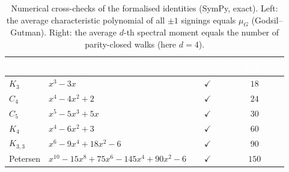 \begin{table}[t]
  \centering
  \small
  \caption{Numerical cross-checks of the formalised identities (SymPy, exact).
  Left: the average characteristic polynomial of all $\pm1$ signings equals
  $\mu_G$ (Godsil--Gutman). Right: the average $d$-th spectral moment equals the
  number of parity-closed walks (here $d=4$).}
  \label{tab:checks}
  \begin{tabular}{@{}llcc@{}}
    \toprule
    \rowcolor{ggteal}
    \textcolor{white}{\textbf{$G$}} & \textcolor{white}{\textbf{$2^{-|E|}\!\sum_{\mathrm{signings}}\det(xI-A_s)$}} & \textcolor{white}{\textbf{$=\mu_G$?}} & \textcolor{white}{\textbf{$\overline{\mathrm{tr}(A_s^{4})}=P_4$}} \\
    \midrule
    \rowcolor{ggband}
    $K_3$ & $x^{3}-3x$         & $\checkmark$ & $18$ \\
    $C_4$ & $x^{4}-4x^{2}+2$   & $\checkmark$ & $24$ \\
    \rowcolor{ggband}
    $C_5$ & $x^{5}-5x^{3}+5x$  & $\checkmark$ & $30$ \\
    $K_4$ & $x^{4}-6x^{2}+3$   & $\checkmark$ & $60$ \\
    \rowcolor{ggband}
    $K_{3,3}$ & $x^{6}-9x^{4}+18x^{2}-6$ & $\checkmark$ & $90$ \\
    Petersen & $x^{10}-15x^{8}+75x^{6}-145x^{4}+90x^{2}-6$ & $\checkmark$ & $150$ \\
    \bottomrule
  \end{tabular}
\end{table}
